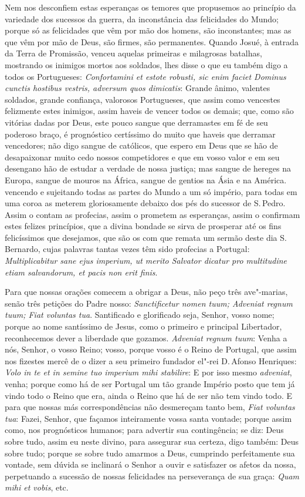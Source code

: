 Nem nos desconfiem estas esperanças os temores que propusemos ao
princípio da variedade dos sucessos da guerra, da inconstância das
felicidades do Mundo; porque só as felicidades que vêm por mão dos
homens, são inconstantes; mas as que vêm por mão de Deus, são firmes,
são permanentes. Quando Josué, à entrada da Terra de Promissão, venceu
aquelas primeiras e milagrosas batalhas, mostrando os inimigos mortos
aos soldados, lhes disse o que eu também digo a todos os Portugueses:
\emph{Confortamini et estote robusti, sic enim faciet Dominus cunctis
hostibus vestris, adversum quos dimicatis}: Grande ânimo, valentes
soldados, grande confiança, valorosos Portugueses, que assim como
vencestes felizmente estes inimigos, assim haveis de vencer todos os
demais; que, como são vitórias dadas por Deus, este pouco sangue que
derramastes em fé de seu poderoso braço, é prognóstico certíssimo do
muito que haveis que derramar vencedores; não digo sangue de católicos,
que espero em Deus que se hão de desapaixonar muito cedo nossos
competidores e que em vosso valor e em seu desengano hão de estudar a
verdade de nossa justiça; mas sangue de hereges na Europa, sangue de
mouros na África, sangue de gentios na Ásia e na América. vencendo e
sujeitando todas as partes do Mundo a um só império, para todas em uma
coroa as meterem gloriosamente debaixo dos pés do sucessor de S.\,Pedro.
Assim o contam as profecias, assim o prometem as esperanças, assim o
confirmam estes felizes princípios, que a divina bondade se sirva de
prosperar até os fins felicíssimos que desejamos, que são os com que
remata um sermão deste dia S.\,Bernardo, cujas palavras tantas vezes têm
sido profecias a Portugal: \emph{Multiplicabitur sane ejus imperium, ut
merito Salvator dicatur pro multitudine etiam salvandorum, et pacis non
erit finis}.

Para que nossas orações comecem a obrigar a Deus, não peço três ave"-marias, senão três petições do Padre nosso: \emph{Sanctificetur nomen
tuum; Adveniat regnum tuum; Fiat voluntas tua}. Santificado e
glorificado seja, Senhor, vosso nome; porque ao nome santíssimo de
Jesus, como o primeiro e principal Libertador, reconhecemos dever a
liberdade que gozamos. \emph{Adveniat regnum tuum}: Venha a nós,
Senhor, o vosso Reino; vosso, porque vosso é o Reino de Portugal, que
assim nos fizestes mercê de o dizer a seu primeiro fundador el"-rei D.\,Afonso
Henriques: \emph{Volo in te et in semine tuo imperium mihi stabilire}: E
por isso mesmo \emph{adveniat}, venha; porque como há de ser Portugal um
tão grande Império posto que tem já vindo todo o Reino que era, ainda o
Reino que há de ser não tem vindo todo. E para que nossas más
correspondências não desmereçam tanto bem, \emph{Fiat voluntas tua}:
Fazei, Senhor, que façamos inteiramente vossa santa vontade; porque
assim como, nos prognósticos humanos; para advertir sua contingência; se
diz: Deus sobre tudo, assim eu neste divino, para assegurar sua certeza,
digo também: Deus sobre tudo; porque se sobre tudo amarmos a Deus,
cumprindo perfeitamente sua vontade, sem dúvida se inclinará o Senhor a
ouvir e satisfazer os afetos da nossa, perpetuando a sucessão de nossas
felicidades na perseverança de sua graça: \emph{Quam mihi et vobis},
etc.

